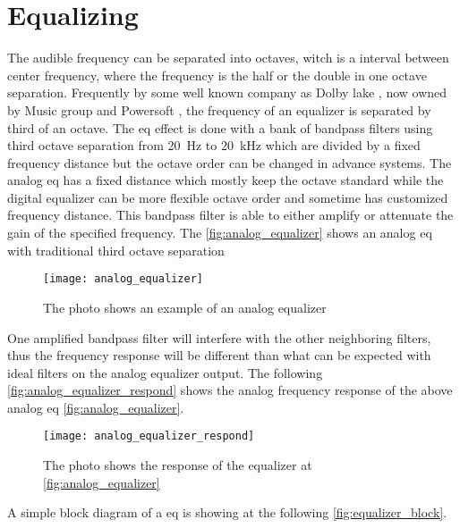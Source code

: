 \section{Equalizing}
The audible frequency can be separated into octaves, witch is a interval between center frequency, where the frequency is the half or the double in one octave separation. Frequently by some well known company as Dolby lake \citep{lab_gruppen_eq}, now owned by Music group and Powersoft \citep{powersoft_eq}, the frequency of an equalizer is separated by third of an octave. 
The \gls{eq} effect is done with a bank of bandpass filters using third octave separation from \SI{20}{\hertz} to \SI{20}{\kilo\hertz} which are divided by a fixed frequency distance but the octave order can be changed in advance systems. The analog \gls{eq} has a fixed distance which mostly keep the octave standard while the digital equalizer can be more flexible octave order and sometime has customized frequency distance. This bandpass filter is able to either amplify or attenuate the gain of the specified frequency. The \autoref{fig:analog_equalizer} shows an analog \gls{eq} with traditional third octave separation \citep{nordic}

\begin{figure} [htbp]
 \centering
  \texttt{[image: analog\_equalizer]}
  \caption{The photo shows an example of an analog equalizer}
  \label{fig:analog_equalizer}
\end{figure}

One amplified bandpass filter will interfere with the other neighboring filters, thus the frequency response will be different than what can be expected with ideal filters on the analog equalizer output. The following \autoref{fig:analog_equalizer_respond} shows the analog frequency response of the above analog \gls{eq} \autoref{fig:analog_equalizer}.

\begin{figure} [htbp]
 \centering
  \texttt{[image: analog\_equalizer\_respond]}
  \caption{The photo shows the response of the equalizer at \autoref{fig:analog_equalizer} \citep{nordic}}
  \label{fig:analog_equalizer_respond}
\end{figure}

A simple block diagram of a \gls{eq}  is showing at the following \autoref{fig:equalizer_block}.

